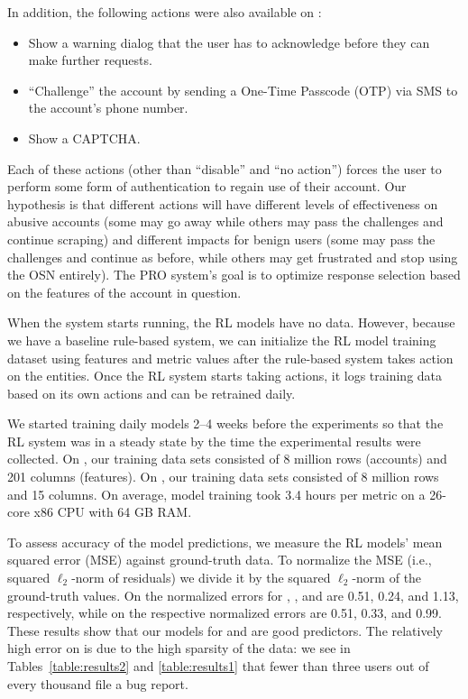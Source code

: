 \noindent In addition, the following actions were also available on \ig:
\begin{itemize}
\squeezelist
    \item Show a warning dialog that the user has to acknowledge before they can make further requests.
    \item ``Challenge'' the account by sending a One-Time Passcode (OTP) via SMS to the account's phone number.
    \item Show a CAPTCHA.
\end{itemize}

Each of these actions (other than ``disable'' and ``no action'') forces the user to perform some form of authentication to regain use of their account. Our hypothesis is that different actions will have different levels of effectiveness on abusive accounts (some may go away while others may pass the challenges and continue scraping) and different impacts for benign users (some  may pass the challenges and continue as before, while others may get frustrated and stop using the OSN entirely). The PRO system's goal is to optimize response selection based on the features of the account in question.


When the system starts running, the RL models have no data. However, because we have a baseline rule-based system, we can initialize the RL model training dataset using features and metric values after the rule-based system takes action on the entities. Once the RL system starts taking actions, it logs training data based on its own actions and can be retrained daily.

We started training daily models 2--4 weeks before the experiments so that the RL system was in a steady state by the time the experimental results were collected. On \ig, our training data sets consisted of 8 million rows (accounts) and 201 columns (features). On \fb, our training data sets consisted of 8 million rows and 15 columns. On average, model training took 3.4 hours per metric on a 26-core x86 CPU with 64 GB RAM.


To assess accuracy of the model predictions, we measure the RL models' mean squared error (MSE) against ground-truth data. To normalize the MSE (i.e., squared $\ell_2$-norm of residuals) we divide it by the squared $\ell_2$-norm of the ground-truth values.  On \ig the normalized errors for \scraping, \daysactive, and \feedback are 0.51, 0.24, and 1.13, respectively, while on \fb the respective normalized errors are 0.51, 0.33, and 0.99.  These results show that our models for \scraping and \daysactive are good predictors. The relatively high error on \feedback is due to the high sparsity of the data: we see in Tables~\ref{table:results2} and \ref{table:results1} that fewer than three users out of every thousand file a bug report.

